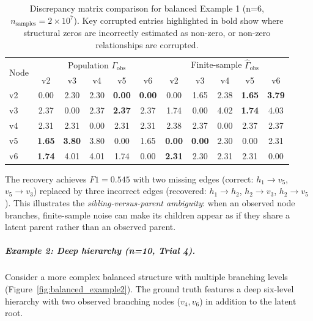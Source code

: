 \documentclass[11pt,a4paper]{article}
\numberwithin{equation}{section}
\begin{document}
\begin{table}[h]
\centering
\caption{Discrepancy matrix comparison for balanced Example 1 (n=6, $n_{\text{samples}} = 2 \times 10^7$). Key corrupted entries highlighted in bold show where structural zeros are incorrectly estimated as non-zero, or non-zero relationships are corrupted.}
\label{tab:balanced_example1}
\small
\begin{tabular}{l|ccccc|ccccc}
\toprule
\multirow{2}{*}{Node} & \multicolumn{5}{c|}{Population $\Gamma_{\text{obs}}$} & \multicolumn{5}{c}{Finite-sample $\hat{\Gamma}_{\text{obs}}$} \\
& v2 & v3 & v4 & v5 & v6 & v2 & v3 & v4 & v5 & v6 \\
\midrule
v2 & 0.00 & 2.30 & 2.30 & \textbf{0.00} & \textbf{0.00} & 0.00 & 1.65 & 2.38 & \textbf{1.65} & \textbf{3.79} \\
v3 & 2.37 & 0.00 & 2.37 & \textbf{2.37} & 2.37 & 1.74 & 0.00 & 4.02 & \textbf{1.74} & 4.03 \\
v4 & 2.31 & 2.31 & 0.00 & 2.31 & 2.31 & 2.38 & 2.37 & 0.00 & 2.37 & 2.37 \\
v5 & \textbf{1.65} & \textbf{3.80} & 3.80 & 0.00 & 1.65 & \textbf{0.00} & \textbf{0.00} & 2.30 & 0.00 & 2.31 \\
v6 & \textbf{1.74} & 4.01 & 4.01 & 1.74 & 0.00 & \textbf{2.31} & 2.30 & 2.31 & 2.31 & 0.00 \\
\bottomrule
\end{tabular}
\end{table}

The recovery achieves $F1 = 0.545$ with two missing edges (correct: $h_1 \to v_5$, $v_5 \to v_3$) replaced by three incorrect edges (recovered: $h_1 \to h_2$, $h_2 \to v_3$, $h_2 \to v_5$). This illustrates the \emph{sibling-versus-parent ambiguity}: when an observed node branches, finite-sample noise can make its children appear as if they share a latent parent rather than an observed parent.

\subparagraph{Example 2: Deep hierarchy (n=10, Trial 4).} Consider a more complex balanced structure with multiple branching levels (Figure~\ref{fig:balanced_example2}). The ground truth features a deep six-level hierarchy with two observed branching nodes ($v_4, v_6$) in addition to the latent root.
\end{document}
